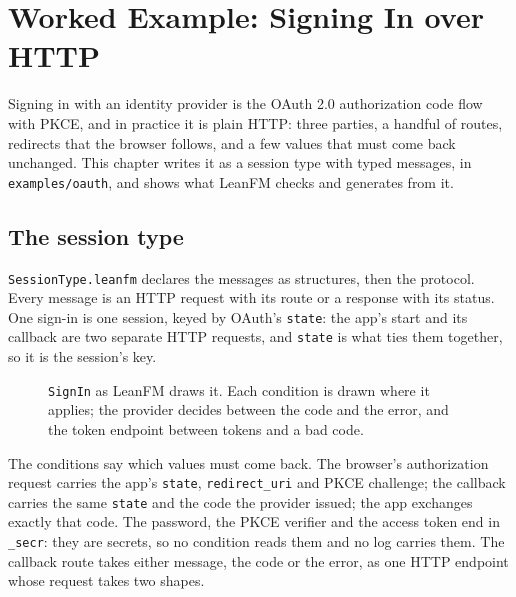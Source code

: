 \chapter{Worked Example: Signing In over HTTP}
\label{ch:oauth-example}

Signing in with an identity provider is the OAuth 2.0 authorization code flow
with PKCE, and in practice it is plain HTTP: three parties, a handful of routes,
redirects that the browser follows, and a few values that must come back
unchanged. This chapter writes it as a session type with typed messages, in
\texttt{examples/oauth}, and shows what LeanFM checks and generates from it.

\section{The session type}

\texttt{SessionType.leanfm} declares the messages as structures, then the
protocol. Every message is an HTTP request with its route or a response with its
status. One sign-in is one session, keyed by OAuth's \texttt{state}: the app's
start and its callback are two separate HTTP requests, and \texttt{state} is what
ties them together, so it is the session's key.



\begin{figure}[htbp]
\centering
{}
\caption{\texttt{SignIn} as LeanFM draws it. Each condition is drawn where it
applies; the provider decides between the code and the error, and the token
endpoint between tokens and a bad code.}
\label{fig:oauth-signin}
\end{figure}

The conditions say which values must come back. The browser's authorization
request carries the app's \texttt{state}, \texttt{redirect\_uri} and PKCE
challenge; the callback carries the same \texttt{state} and the code the provider
issued; the app exchanges exactly that code. The password, the PKCE verifier and
the access token end in \texttt{\_secr}: they are secrets, so no condition reads
them and no log carries them. The callback route takes either message, the code
or the error, as one HTTP endpoint whose request takes two shapes.


